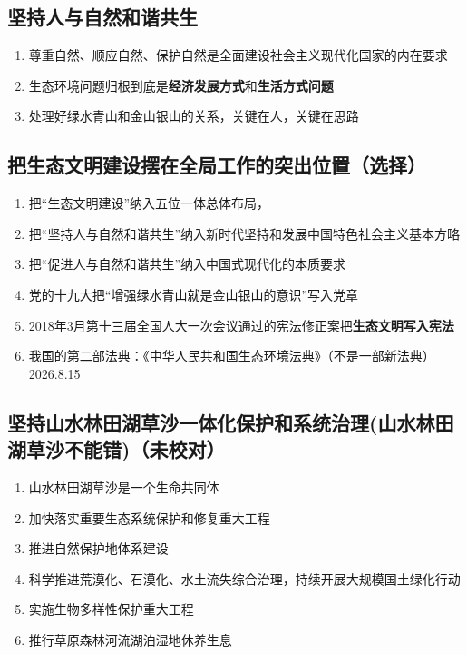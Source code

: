 \documentclass{ctexart}
\numberwithin{figure}{section}
\numberwithin{equation}{section}
\begin{document}
    \subsection{坚持人与自然和谐共生}
    \begin{enumerate}
        \item 尊重自然、顺应自然、保护自然是全面建设社会主义现代化国家的内在要求
        \item 生态环境问题归根到底是\textbf{经济发展方式}和\textbf{生活方式问题}
        \item 处理好绿水青山和金山银山的关系，关键在人，关键在思路
    \end{enumerate}
    \begin{tcolorbox}[colback=blue!5!white]
    \subsection{把生态文明建设摆在全局工作的突出位置（选择）}
    \begin{enumerate}
        \item 把“生态文明建设”纳入五位一体总体布局，
        \item 把“坚持人与自然和谐共生”纳入新时代坚持和发展中国特色社会主义基本方略
        \item 把“促进人与自然和谐共生”纳入中国式现代化的本质要求
        \item 党的十九大把“增强绿水青山就是金山银山的意识”写入党章
        \item 2018年3月第十三届全国人大一次会议通过的宪法修正案把\textbf{生态文明写入宪法}
        \item 我国的第二部法典：《中华人民共和国生态环境法典》（不是一部新法典）2026.8.15
    \end{enumerate}
    \end{tcolorbox} 
    \begin{tcolorbox}[colback=blue!5!white]
    \subsection{坚持山水林田湖草沙一体化保护和系统治理(山水林田湖草沙不能错)（未校对）}
    \begin{enumerate}
        \item 山水林田湖草沙是一个生命共同体
        \item 加快落实重要生态系统保护和修复重大工程
        \item 推进自然保护地体系建设
        \item 科学推进荒漠化、石漠化、水土流失综合治理，持续开展大规模国土绿化行动
        \item 实施生物多样性保护重大工程
        \item 推行草原森林河流湖泊湿地休养生息
    \end{enumerate}
    \end{tcolorbox}
\end{document}

